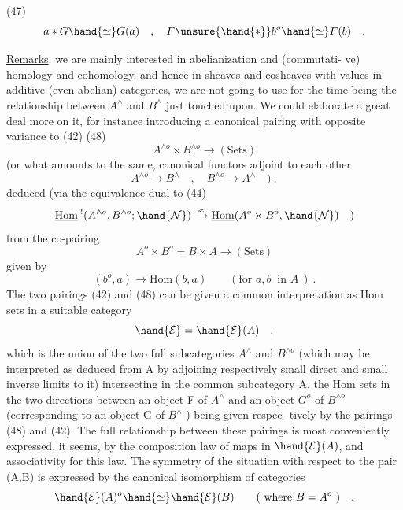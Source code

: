 
(47) \[ a * G \hand{\simeq} G(a) \quad , \quad F \unsure{\hand{*}} b^{o} \hand{\simeq} F(b) \quad . \]

\uline{Remarks}.   we are mainly interested in abelianization\xout{,} and  (commutati-%
ve) homology and cohomology,  and hence in  sheaves and
cosheaves with values in additive (even abelian) categories,  we are not
going to use for the time being the relationship between $A^{\wedge}$ and $B^{\wedge}$
just touched upon.  We could elaborate a great deal more on it,  for
instance introducing a canonical pairing with opposite variance to (42)
(48) \[ A^{\wedge o} \times B^{\wedge o} \longrightarrow (\mathrm{Sets}) \]
(or what amounts to the same,  canonical functors adjoint to each other
\[ A^{\wedge o} \to B^{\wedge} \quad , \quad B^{\wedge o} \to A^{\wedge} \quad ) \ , \]
deduced (via the  equivalence dual to (44)
\[ \underline{\mathrm{Hom}}^{!!}(A^{\wedge o},B^{\wedge o};\hand{\mathcal{N}}) \xrightarrow{\approx} \underline{\mathrm{Hom}}(A^{o}\times B^{o},\hand{\mathcal{N}}) \quad ) \]
from the co-pairing
\[ A^{o} \times B^{o} = B \times A \longrightarrow (\mathrm{Sets}) \]
given by
\[ (b^{o},a) \longrightarrow \mathrm{Hom}(b,a) \qquad (\text{for } a,b \ \text{ in } A\ ) \ . \]
The two pairings (42) and (48) can be given a common interpretation as
Hom  sets in a suitable category
\[ \hand{\mathcal{E}} = \hand{\mathcal{E}}(A) \quad , \]
which is the union of the two full subcategories  $A^{\wedge}$ and $B^{\wedge o}$  (which may
be interpreted as deduced from A by adjoining respectively small direct
and small inverse limits to it) intersecting in the common subcategory A,
the Hom sets in the two directions between an object F of $A^{\wedge}$ and an object
$G^{o}$ of $B^{\wedge o}$ (corresponding to an object G of $B^{\wedge}$ )  being given  respec-%
 tively by the pairings (48) and (42).  The full relationship 
between these pairings is most conveniently expressed,  it seems,  by the
composition law of  maps in $\hand{\mathcal{E}}(A)$,  and associativity for this law.
The symmetry of the situation with respect to the pair (A,B)  is expressed
by the canonical isomorphism of categories
\[ \hand{\mathcal{E}}(A)^{o} \hand{\simeq} \hand{\mathcal{E}}(B) \qquad (\ \text{where } B = A^{o}\ ) \quad . \]

